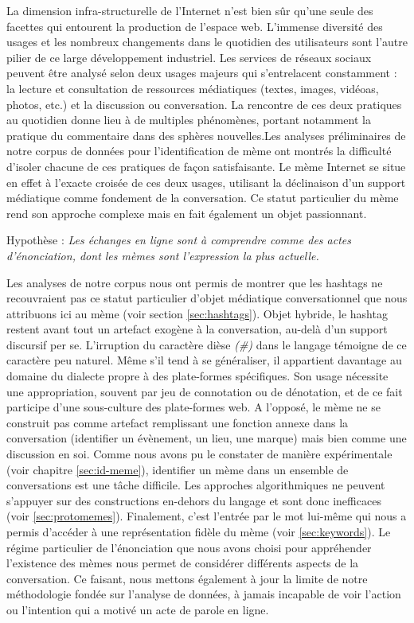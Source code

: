 La dimension infra-structurelle de l'Internet n'est bien sûr qu'une seule des facettes qui entourent la production de l'espace web. L'immense diversité des usages et les nombreux changements dans le quotidien des utilisateurs sont l'autre pilier de ce large développement industriel. Les services de réseaux sociaux peuvent être analysé selon deux usages majeurs qui s'entrelacent constamment : la lecture et consultation de ressources médiatiques (textes, images, vidéoas, photos, etc.) et la discussion ou conversation. La rencontre de ces deux pratiques au quotidien donne lieu à de multiples phénomènes, portant notamment la pratique du commentaire dans des sphères nouvelles.Les analyses préliminaires de notre corpus de données pour l'identification de mème ont montrés la difficulté d'isoler chacune de ces pratiques de façon satisfaisante. Le mème Internet se situe en effet à l'exacte croisée de ces deux usages, utilisant la déclinaison d'un support médiatique comme fondement de la conversation. Ce statut particulier du mème rend son approche complexe mais en fait également un objet passionnant. 

Hypothèse : \textit{Les échanges en ligne sont à comprendre comme des actes d'énonciation, dont les mèmes sont l'expression la plus actuelle.}

Les analyses de notre corpus nous ont permis de montrer que les hashtags ne recouvraient pas ce statut particulier d'objet médiatique conversationnel que nous attribuons ici au mème (voir section \ref{sec:hashtags}). Objet hybride, le hashtag restent avant tout un artefact exogène à la conversation, au-delà d'un support discursif per se. L'irruption du caractère dièse \textit{(\#)} dans le langage témoigne de ce caractère peu naturel. Même s'il tend à se généraliser, il appartient davantage au domaine du dialecte propre à des plate-formes spécifiques. Son usage nécessite une appropriation, souvent par jeu de connotation ou de dénotation, et de ce fait participe d'une sous-culture des plate-formes web. A l'opposé, le mème ne se construit pas comme artefact remplissant une fonction annexe dans la conversation (identifier un évènement, un lieu, une marque) mais bien comme une discussion en soi. Comme nous avons pu le constater de manière expérimentale (voir chapitre \ref{sec:id-meme}), identifier un mème dans un ensemble de conversations est une tâche difficile. Les approches algorithmiques ne peuvent s'appuyer sur des constructions en-dehors du langage et sont donc inefficaces (voir \ref{sec:protomemes}). Finalement, c'est l'entrée par le mot lui-même qui nous a permis d'accéder à une représentation fidèle du mème (voir \ref{sec:keywords}). Le régime particulier de l'énonciation que nous avons choisi pour appréhender l'existence des mèmes nous permet de considérer différents aspects de la conversation. Ce faisant, nous mettons également à jour la limite de notre méthodologie fondée sur l'analyse de données, à jamais incapable de voir l'action ou l'intention qui a motivé un acte de parole en ligne. 

